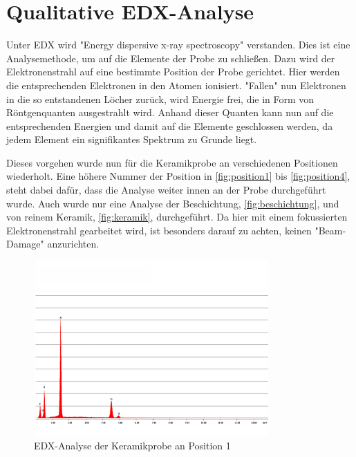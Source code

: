 \documentclass[12pt,english,ngerman]{scrartcl}
\begin{document}
\section{Qualitative EDX-Analyse}

Unter EDX wird "Energy dispersive x-ray spectroscopy" verstanden. Dies ist eine Analysemethode, um auf die Elemente der 
Probe zu schließen. Dazu wird der Elektronenstrahl auf eine bestimmte Position der Probe gerichtet. Hier werden die
entsprechenden Elektronen in den Atomen ionisiert. "Fallen" nun Elektronen in die so entstandenen Löcher zurück, wird
Energie frei, die in Form von Röntgenquanten ausgestrahlt wird. Anhand dieser Quanten kann nun auf die entsprechenden
Energien und damit auf die Elemente geschlossen werden, da jedem Element ein signifikantes Spektrum zu Grunde liegt.


Dieses vorgehen wurde nun für die Keramikprobe an verschiedenen Positionen wiederholt. Eine höhere Nummer der Position
in \autoref{fig:position1} bis \autoref{fig:position4},
steht dabei dafür, dass die Analyse weiter innen an der Probe durchgeführt wurde. Auch wurde nur eine Analyse
der Beschichtung, \autoref{fig:beschichtung}, und von reinem Keramik, \autoref{fig:keramik}, durchgeführt.
Da hier mit einem fokussierten Elektronenstrahl gearbeitet wird, ist besonders darauf zu achten, keinen "Beam-Damage"
anzurichten.

\begin{figure}[H]
	\begin{center}
		\includegraphics[width =0.8\textwidth]{./figures/edx1.png}
	\end{center}
	\caption{EDX-Analyse der Keramikprobe an Position 1 \cite{sein_foto}}
    \label{fig:position1}
\end{figure}
\end{document}
